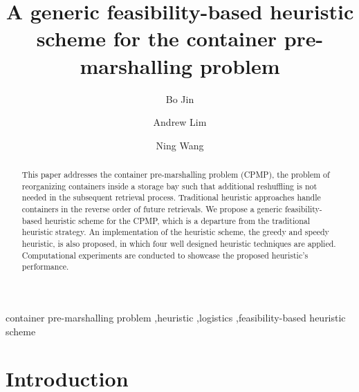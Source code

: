 \documentclass[review,3p,times,12pt,number]{elsarticle}\usepackage{amsmath}\usepackage{amssymb}
\begin{document}
\begin{frontmatter}

\title{A generic feasibility-based heuristic scheme for the container pre-marshalling problem}
\author[cityu]{Bo Jin}
\author[cityu]{Andrew Lim}

\author[shu]{Ning Wang}




\address[cityu]{Department of Management Sciences, City University of Hong Kong, Tat Chee Avenue, Kowloon Tong, Hong Kong}
\address[shu]{Department of Information Management, School of Management, Shanghai University, Shanghai, China}

\begin{abstract}

This paper addresses the container pre-marshalling problem (CPMP), the problem of reorganizing containers inside a storage bay such that additional reshuffling is not needed in the subsequent retrieval process. Traditional heuristic approaches handle containers in the reverse order of future retrievals. We propose a generic feasibility-based heuristic scheme for the CPMP, which is a departure from the traditional heuristic strategy. An implementation of the heuristic scheme, the greedy and speedy heuristic, is also proposed, in which four well designed heuristic techniques are applied. Computational experiments are conducted to showcase the proposed heuristic's performance. 
\end{abstract}

\begin{keyword}
container pre-marshalling problem \sep heuristic \sep logistics \sep feasibility-based heuristic scheme
\end{keyword}
\end{frontmatter}




\section{Introduction}
\end{document}

